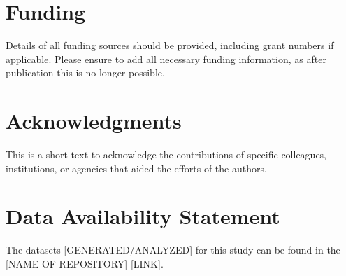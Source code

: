 \documentclass[utf8]{frontiersSCNS} %
\begin{document}
\section*{Funding}
Details of all funding sources should be provided, including grant numbers if applicable. Please ensure to add all necessary funding information, as after publication this is no longer possible.

\section*{Acknowledgments}
This is a short text to acknowledge the contributions of specific colleagues, institutions, or agencies that aided the efforts of the authors.

\section*{Data Availability Statement}
The datasets [GENERATED/ANALYZED] for this study can be found in the [NAME OF REPOSITORY] [LINK].
%



\end{document}
